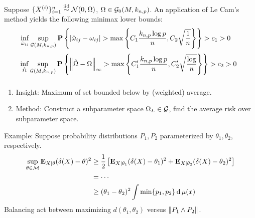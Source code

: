 \begin{frame}[fragile] \frametitle{}

    \vspace{0.5cm}
    Suppose $\{X^{(i)}\}_{i=1}^n \stackrel{\mathrm{iid}}{\sim} \mathcal{N}(0, \Omega)$, $\Omega \in \mathcal{G}_0(M,
    k_{n, p})$.  An application of Le Cam's method yields the following minimax
    lower bounds:
    \vspace{0.2cm}
    $$
    \hspace{-0.5cm}
    \inf_{\hat\omega_{ij}} \sup_{\Gg(M, k_{n, p})}
    \PP\left\{
    |\hat\omega_{ij} - \omega_{ij}| > \max\left\{
    C_1\frac{k_{n, p}\log p}{n}, C_2 \sqrt\frac{1}{n}
    \right\}
    \right\} > c_1 > 0
    $$
    $$
    \hspace{-0.2cm}
    \inf_{\hat\Omega} \sup_{\Gg(M, k_{n, p})}
    \PP\left\{
        \norm{\hat\Omega - \Omega}_\infty > \max\left\{
    C_1'\frac{k_{n, p}\log p}{n}, C_2' \sqrt\frac{\log}{n}
    \right\}
    \right\} > c_2 > 0
    $$
    
\end{frame}
\begin{frame}[fragile] \frametitle{}
    \begin{enumerate}
        \item Insight: Maximum of set bounded below by (weighted) average.
        \item Method: Construct a subparameter space $\Omega_L \in \mathcal{G}$, find
            the average risk over subparameter space.
    \end{enumerate}
    \vspace{-0.3cm}
    Example: Suppose probability distributions $P_1, P_2$ parameterized by
    $\theta_1, \theta_2$, respectively.
    \vspace{-0.2cm}
    \begin{align*}
        \sup_{\theta \in \mathcal{M}} \mathbf{E}_{X|\theta} (\delta(X) - \theta)^2
        &\geq \frac{1}{2}\left[
        \mathbf{E}_{X|\theta_1} (\delta(X) - \theta_1)^2
        +
        \mathbf{E}_{X|\theta_2} (\delta(X) - \theta_2)^2
        \right] \\
        &=      \cdots  \\
        &\geq (\theta_1 - \theta_2)^2 \int \min\{p_1, p_2\} \operatorname{\mathrm{d}} \mu(x)
    \end{align*}
    Balancing act between maximizing $d(\theta_1, \theta_2)$ versus
    $\left\lVert P_1 \wedge P_2\right\rVert$.
\end{frame}
\begin{frame}[fragile] \frametitle{}
\end{frame}


